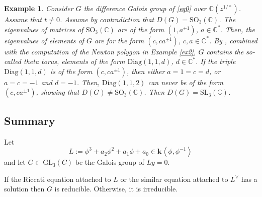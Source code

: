 \documentclass[a4paper,11pt]{amsart}
\newcommand{\GL}{\operatorname{GL}}
\newtheorem{ex}[thm]{Example}
\def\k{\mathbf{k}}
\def\GL{\mathrm{GL}}
\def\C{\mathbb{C}}
\begin{document}
\begin{ex}\label{ex4}
Consider $G$ the difference Galois group of \eqref{eq0} over $\C(z^{1/*})$. Assume that $t\neq 0$. Assume by contradiction that $D(G)=\mathrm{SO}_3(\C)$.
The eigenvalues of matrices of $\mathrm{SO}_3(\C)$ are of the form $(1,a^{\pm 1})$,  $a\in \C^*$.  Then,  the eigenvalues of elements of $G$ are for the form $(c,ca^{\pm 1})$,  $c,a\in \C^*$.   By \cite[Section 2.4]{RS2009}, combined with the computation of the Newton polygon in Example \ref{ex2}, $G$ contains the so-called theta torus,  elements of the form $\mathrm{Diag}(1,1,d)$, $d\in \C^*$.  If the triple  $\mathrm{Diag}(1,1,d)$ is of the form $(c,ca^{\pm 1})$, then either $a=1=c=d$, or $a=c=-1$ and $d=-1$.  Then,  $\mathrm{Diag}(1,1,2)$ can never be of the form $(c,ca^{\pm 1})$,  showing that $D(G)\neq \mathrm{SO}_3(\C)$.  Then $D(G)=\mathrm{SL}_3(\C)$. 
\end{ex}

 \subsection{Summary}
  Let 
 $$
 L := \phi^3 + a_2 \phi^2 +a_1 \phi +a_0\in \k\left< \phi,\phi^{-1}\right>
 $$  and let $G\subset \GL_{3}(C)$ be the Galois group of $Ly=0$.
 
If the Riccati  equation  attached to $L$ or the similar equation attached to $L^{\vee}$  has a solution then $G$ is reducible. Otherwise, it is irreducible.
\medskip
\end{document}
